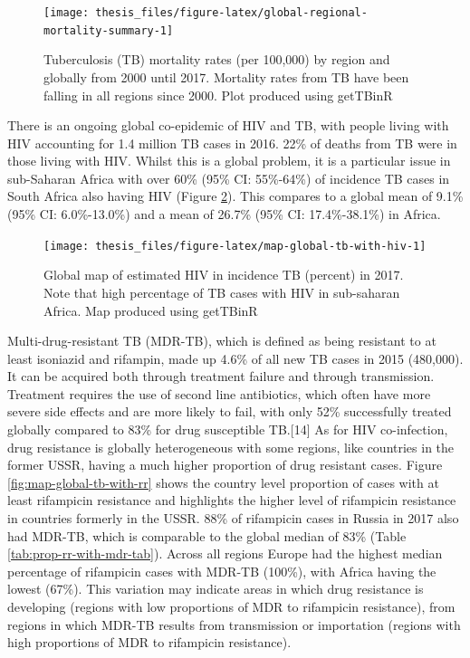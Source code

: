 \documentclass[11pt,twoside]{bristolthesis}
\begin{document}
  \begin{figure}
  
  {\centering \texttt{[image: thesis\_files/figure-latex/global-regional-mortality-summary-1]} 
  
  }
  
  \caption{Tuberculosis (TB) mortality rates (per 100,000) by region and globally from 2000 until 2017. Mortality rates from TB have been falling in all regions since 2000. Plot produced using getTBinR}\label{fig:global-regional-mortality-summary}
  \end{figure}
  There is an ongoing global co-epidemic of HIV and TB, with people living with HIV accounting for 1.4 million TB cases in 2016. 22\% of deaths from TB were in those living with HIV. Whilst this is a global problem, it is a particular issue in sub-Saharan Africa with over 60\% (95\% CI: 55\%-64\%) of incidence TB cases in South Africa also having HIV (Figure \ref{fig:map-global-tb-with-hiv}). This compares to a global mean of 9.1\% (95\% CI: 6.0\%-13.0\%) and a mean of 26.7\% (95\% CI: 17.4\%-38.1\%) in Africa.
  \begin{figure}
  
  {\centering \texttt{[image: thesis\_files/figure-latex/map-global-tb-with-hiv-1]} 
  
  }
  
  \caption{Global map of estimated HIV in incidence TB (percent) in 2017. Note that high percentage of TB cases with HIV in sub-saharan Africa. Map produced using getTBinR}\label{fig:map-global-tb-with-hiv}
  \end{figure}
  Multi-drug-resistant TB (MDR-TB), which is defined as being resistant to at least isoniazid and rifampin, made up 4.6\% of all new TB cases in 2015 (480,000). It can be acquired both through treatment failure and through transmission. Treatment requires the use of second line antibiotics, which often have more severe side effects and are more likely to fail, with only 52\% successfully treated globally compared to 83\% for drug susceptible TB.{[}14{]} As for HIV co-infection, drug resistance is globally heterogeneous with some regions, like countries in the former USSR, having a much higher proportion of drug resistant cases. Figure \ref{fig:map-global-tb-with-rr} shows the country level proportion of cases with at least rifampicin resistance and highlights the higher level of rifampicin resistance in countries formerly in the USSR. 88\% of rifampicin cases in Russia in 2017 also had MDR-TB, which is comparable to the global median of 83\% (Table \ref{tab:prop-rr-with-mdr-tab}). Across all regions Europe had the highest median percentage of rifampicin cases with MDR-TB (100\%), with Africa having the lowest (67\%). This variation may indicate areas in which drug resistance is developing (regions with low proportions of MDR to rifampicin resistance), from regions in which MDR-TB results from transmission or importation (regions with high proportions of MDR to rifampicin resistance).
\end{document}
